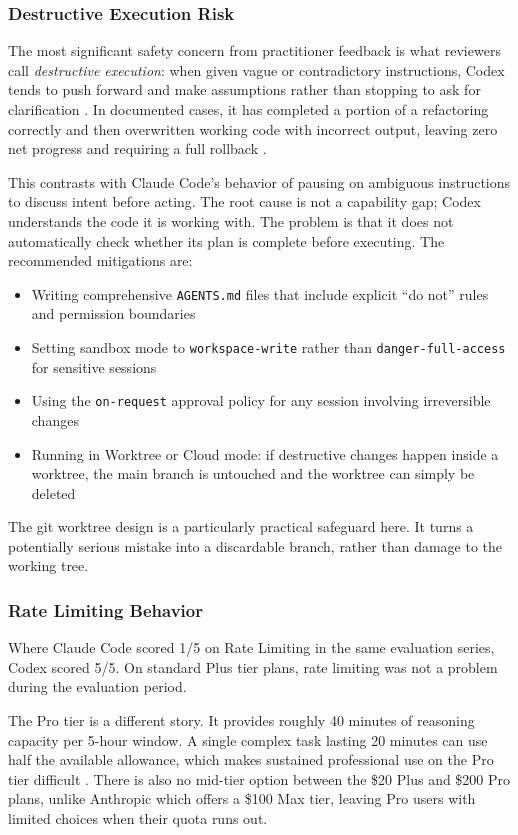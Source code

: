 \documentclass[conference]{IEEEtran}
\begin{document}
\subsubsection{Destructive Execution Risk}
The most significant safety concern from practitioner feedback is what reviewers call \textit{destructive execution}: when given vague or contradictory instructions, Codex tends to push forward and make assumptions rather than stopping to ask for clarification \cite{wiegold2026}. In documented cases, it has completed a portion of a refactoring correctly and then overwritten working code with incorrect output, leaving zero net progress and requiring a full rollback \cite{reddit2026}.

This contrasts with Claude Code's behavior of pausing on ambiguous instructions to discuss intent before acting. The root cause is not a capability gap; Codex understands the code it is working with. The problem is that it does not automatically check whether its plan is complete before executing. The recommended mitigations are:
\begin{itemize}
    \item Writing comprehensive \texttt{AGENTS.md} files that include explicit ``do not'' rules and permission boundaries
    \item Setting sandbox mode to \texttt{workspace-write} rather than \texttt{danger-full-access} for sensitive sessions
    \item Using the \texttt{on-request} approval policy for any session involving irreversible changes
    \item Running in Worktree or Cloud mode: if destructive changes happen inside a worktree, the main branch is untouched and the worktree can simply be deleted
\end{itemize}

The git worktree design is a particularly practical safeguard here. It turns a potentially serious mistake into a discardable branch, rather than damage to the working tree.

\subsubsection{Rate Limiting Behavior}
Where Claude Code scored 1/5 on Rate Limiting in the same evaluation series, Codex scored 5/5. On standard Plus tier plans, rate limiting was not a problem during the evaluation period.

The Pro tier is a different story. It provides roughly 40 minutes of reasoning capacity per 5-hour window. A single complex task lasting 20 minutes can use half the available allowance, which makes sustained professional use on the Pro tier difficult \cite{openai_community2026}. There is also no mid-tier option between the \$20 Plus and \$200 Pro plans, unlike Anthropic which offers a \$100 Max tier, leaving Pro users with limited choices when their quota runs out.
\end{document}
